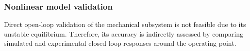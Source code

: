 \subsubsection{Nonlinear model validation}
Direct open-loop validation of the mechanical subsystem is not feasible due to 
its unstable equilibrium. Therefore, its accuracy is indirectly assessed by 
comparing simulated and experimental closed-loop responses around the operating 
point.





